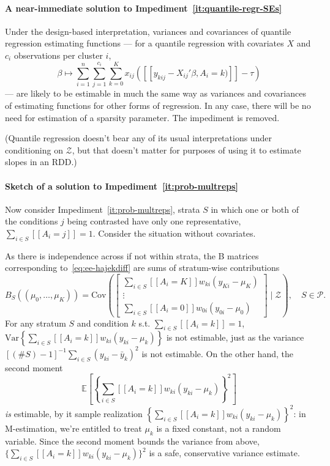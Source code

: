 \paragraph*{A near-immediate solution to
  Impediment~\ref{it:quantile-regr-SEs}}
Under the design-based interpretation, variances and covariances of
quantile regression estimating functions --- for a quantile regression
with covariates $X$ and $c_{i}$ observations per cluster $i$,
\begin{equation*}
\beta \mapsto  \sum_{i=1}^{n}\sum_{j=1}^{c_{i}}\sum_{k=0}^{K} x_{ij}([\![y_{kij} -
  X_{ij}'\beta, A_{i}= k)]\!] - \tau)
\end{equation*}
\citep[][\S2.7]{he18resampling} --- are likely to be estimable in
much the same way as variances and covariances of estimating functions
for other forms of regression.  In any case, there will be no need for
estimation of a sparsity parameter.  The impediment is removed.

(Quantile regression doesn't bear any of its usual interpretations
under conditioning on $\mathcal{Z}$, but that doesn't matter for
purposes of using it to estimate slopes in an RDD.)

\paragraph*{Sketch of a solution to Impediment~\ref{it:prob-multreps}}
Now consider Impediment~\ref{it:prob-multreps},  strata $S$ in which one
or both of the conditions $j$ being contrasted have only one
representative, $\sum_{i\in S} [\![A_{i}=j]\!] =1$. Consider the situation without covariates.

As there is independence across if not within strata, the
B matrices corresponding to~\eqref{eq:ee-hajekdiff} are sums of
stratum-wise contributions
\begin{equation} \label{eq:Bform}
B_S((\mu_0, \ldots, \mu_K)) =
\mathrm{Cov}\left(\left[
\begin{array}{c}
\sum_{i\in S} [\![A_i=K]\!] w_{ki} (y_{Ki} - \mu_K) \\
\vdots \\
\sum_{i\in S} [\![A_i=0]\!] w_{0i} (y_{0i} - \mu_0)
\end{array}
\right] \mid \mathcal{Z}\right), \quad S \in \mathcal{P}.
\end{equation}
For any stratum $S$ and condition $k$ s.t.  $\sum_{i \in S}  [\![A_i=k]\!] =1$, $\mathrm{Var}\left\{ \sum_{i\in S} [\![A_i=k]\!] w_{ki} (y_{ki} - \mu_k) \right\}$ is not estimable, just as the variance $[(\# S)-1]^{-1}\sum_{i \in S} (y_{ki} - \bar{y}_k)^2$ is not estimable. On the other hand, the second moment
\[ \mathbb{E}\left[\left\{ \sum_{i\in S} [\![A_i=k]\!] w_{ki} (y_{ki} - \mu_k) \right\}^2\right]
\]
\textit{is} estimable, by it sample realization \(\left\{ \sum_{i\in
    S} [\![A_i=k]\!] w_{ki} (y_{ki} - \mu_k) \right\}^2\): in
M-estimation, we're entitled to treat $\mu_k$ is a fixed constant, not
a random variable. Since the second moment  bounds the variance from above,  \(\{\sum_{i\in S} [\![A_i=k]\!] w_{ki} (y_{ki} - \mu_k)\}^2\) is a safe, conservative variance estimate.

